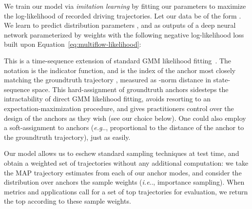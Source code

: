 \documentclass{article}
\makeatletter
\DeclareRobustCommand\onedot{\futurelet\@let@token\@onedot}
\def\@onedot{\ifx\@let@token.\else.\null\fi\xspace}
\def\eg{\emph{e.g}\onedot} \def\Eg{\emph{E.g}\onedot}
\def\ie{\emph{i.e}\onedot} \def\Ie{\emph{I.e}\onedot}
\newcommand{\out}[1]{}
\makeatother
\begin{document}
We train our model via {\em imitation learning} by fitting our parameters to maximize the log-likelihood of recorded driving trajectories. 
Let our data be of the form . We learn to predict distribution parameters ,  and  as outputs of a deep neural network parameterized by weights  with the following negative log-likelihood loss built upon Equation~\ref{eq:multiflow-likelihood}:

This is a time-sequence extension of standard GMM likelihood fitting~\cite{Bishop06}. The notation  is the indicator function, and  is the index of the anchor most closely matching the groundtruth trajectory , measured as -norm distance in state-sequence space.  This hard-assignment of groundtruth anchors sidesteps the intractability of direct GMM likelihood fitting, avoids resorting to an expectation-maximization procedure, and gives practitioners control over the design of the anchors as they wish (see our choice below).  One could also employ a soft-assignment to anchors (\eg, proportional to the distance of the anchor to the groundtruth trajectory), just as easily.

Our model allows us to eschew standard sampling techniques at test time, and obtain a weighted set of  trajectories without any additional computation:  we take the MAP trajectory estimates from each of our  anchor modes, and consider the distribution over anchors  the sample weights (\ie, importance sampling).  When metrics and applications call for a set of top  trajectories for evaluation, we return the top  according to these sample weights.

\out{
\subsection{Sampling weighted trajectories}

To generate a discrete set of weighted trajectories, \ie, trajectories with scores that add up to one, we evaluate all  clusters, yielding  distinct trajectories  in the form of . Their likelihoods are given by the softmax functions . Due to our choice of making the estimation of  and  conditionally independent in time, this model does not allow additional sampling. However, we usually choose a large enough  so that we always end up with more trajectories than requested. If the model is required to return fewer trajectories than , which is typically the case for most metrics discussed in the experiments, we simply sort the  trajectories by their scores . 
}
\end{document}

